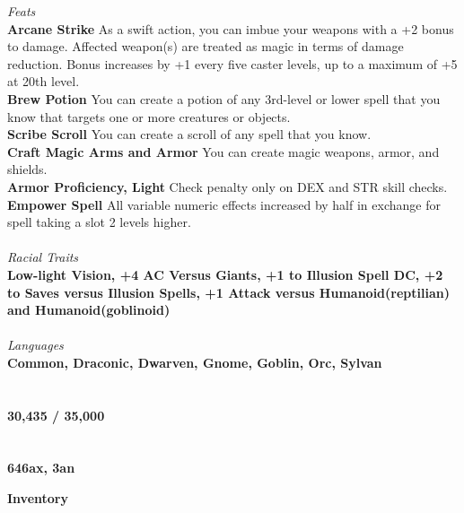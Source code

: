 \documentclass[letterpaper]{article}
\begin{document}
\noindent\emph{Feats} \\
\noindent\textbf{Arcane Strike} As a swift action, you can imbue your weapons with a +2 bonus to damage.  Affected weapon(s) are treated as magic in terms of damage reduction.  Bonus increases by +1 every five caster levels, up to a maximum of +5 at 20th level. \\
\noindent\textbf{Brew Potion} You can create a potion of any 3rd-level or lower spell that you know that targets one or more creatures or objects. \\
\noindent\textbf{Scribe Scroll} You can create a scroll of any spell that you know. \\
\noindent\textbf{Craft Magic Arms and Armor} You can create magic weapons, armor, and shields. \\
\noindent\textbf{Armor Proficiency, Light} Check penalty only on {\footnotesize DEX} and {\footnotesize STR} skill checks. \\
\noindent\textbf{Empower Spell} All variable numeric effects increased by half in exchange for spell taking a slot 2 levels higher. \\
\\
\noindent\emph{Racial Traits} \\
\textbf{Low-light Vision, +4 AC Versus Giants, +1 to Illusion Spell DC, +2 to Saves versus Illusion Spells, +1 Attack versus Humanoid(reptilian) and Humanoid(goblinoid)} \\
\\
\noindent\emph{Languages} \\
\textbf{Common, Draconic, Dwarven, Gnome, Goblin, Orc, Sylvan} \\
\\
 \\
\textbf{30,435 / 35,000} \\
\\
 \\
\textbf{646ax, 3an} \\

\pagebreak

\noindent \textbf{\huge{Inventory}} \\
\end{document}
